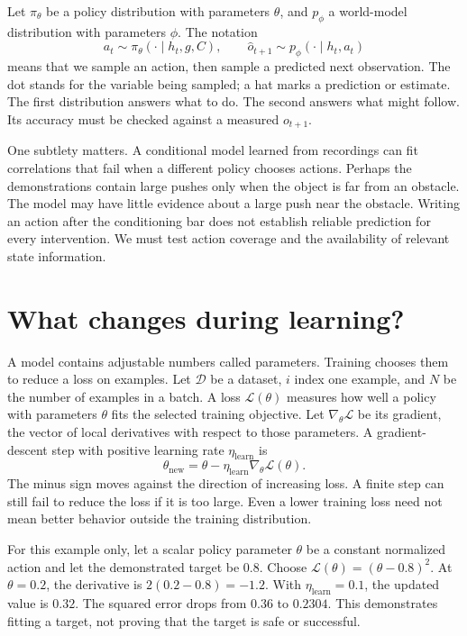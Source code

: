 Let $\pi_\theta$ be a policy distribution with parameters $\theta$, and $p_\phi$ a world-model distribution with parameters $\phi$. The notation
\begin{equation}
 a_t\sim\pi_\theta(\cdot\mid h_t,g,C),\qquad
 \widehat o_{t+1}\sim p_\phi(\cdot\mid h_t,a_t)
 \label{eq:foundation-distributions}
\end{equation}
means that we sample an action, then sample a predicted next observation. The dot stands for the variable being sampled; a hat marks a prediction or estimate. The first distribution answers what to do. The second answers what might follow. Its accuracy must be checked against a measured $o_{t+1}$.

One subtlety matters. A conditional model learned from recordings can fit correlations that fail when a different policy chooses actions. Perhaps the demonstrations contain large pushes only when the object is far from an obstacle. The model may have little evidence about a large push near the obstacle. Writing an action after the conditioning bar does not establish reliable prediction for every intervention. We must test action coverage and the availability of relevant state information.

\section{What changes during learning?}
A model contains adjustable numbers called parameters. Training chooses them to reduce a loss on examples. Let $\mathcal D$ be a dataset, $i$ index one example, and $N$ be the number of examples in a batch. A loss $\mathcal L(\theta)$ measures how well a policy with parameters $\theta$ fits the selected training objective. Let $\nabla_\theta\mathcal L$ be its gradient, the vector of local derivatives with respect to those parameters. A gradient-descent step with positive learning rate $\eta_{\mathrm{learn}}$ is
\begin{equation}
 \theta_{\mathrm{new}}=\theta-\eta_{\mathrm{learn}}\nabla_\theta\mathcal L(\theta).
 \label{eq:foundation-descent}
\end{equation}
The minus sign moves against the direction of increasing loss. A finite step can still fail to reduce the loss if it is too large. Even a lower training loss need not mean better behavior outside the training distribution.

For this example only, let a scalar policy parameter $\theta$ be a constant normalized action and let the demonstrated target be 0.8. Choose $\mathcal L(\theta)=(\theta-0.8)^2$. At $\theta=0.2$, the derivative is $2(0.2-0.8)=-1.2$. With $\eta_{\mathrm{learn}}=0.1$, the updated value is $0.32$. The squared error drops from $0.36$ to $0.2304$. This demonstrates fitting a target, not proving that the target is safe or successful.

